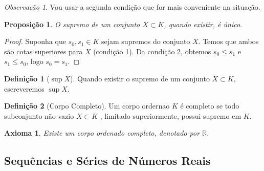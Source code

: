 \documentclass{article}
\newtheorem{axioma}{Axioma}
\newtheorem{prop}{Proposição}[section]
\theoremstyle{theorem}
\theoremstyle{lemma}
\theoremstyle{definition}
\newtheorem{definicao}{Definição}[section]
\theoremstyle{remark}
\newtheorem{obs}{Observação}[section]
\begin{document}
\begin{obs}
	Vou usar a segunda condição que for mais conveniente na situação.
\end{obs}
\begin{prop}
	O supremo de um conjunto $X\subset K$, quando existir, é único.
\end{prop}
\begin{proof}
	Suponha que $s_0,s_1\in K$ sejam supremos do conjunto $X$. Temos que ambos são cotas superiores para $X$ (condição 1). Da condição 2, obtemos $s_0 \leq s_1$ e $s_1\leq s_0$, logo $s_0 = s_1$.
\end{proof}
\begin{definicao}[$\sup X$]
	Quando existir o supremo de um conjunto $X\subset K$, escreveremos $\sup X$.
\end{definicao}
\begin{definicao}[Corpo Completo]
	Um corpo ordernao $K$ é completo se todo subconjunto não-vazio $X\subset K$ , limitado superiormente, possui supremo em $K$.
\end{definicao}
\begin{axioma}
	Existe um corpo ordenado completo, denotado por $\mathbb{R}$.
\end{axioma}
\subsection{ Sequências e Séries de Números Reais}
\end{document}
